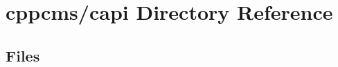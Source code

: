 \section{cppcms/capi Directory Reference}
\label{dir_463651aad62193dced6fe25de9dcb4b9}
\subsection*{Files}
\begin{DoxyCompactItemize}
\end{DoxyCompactItemize}
